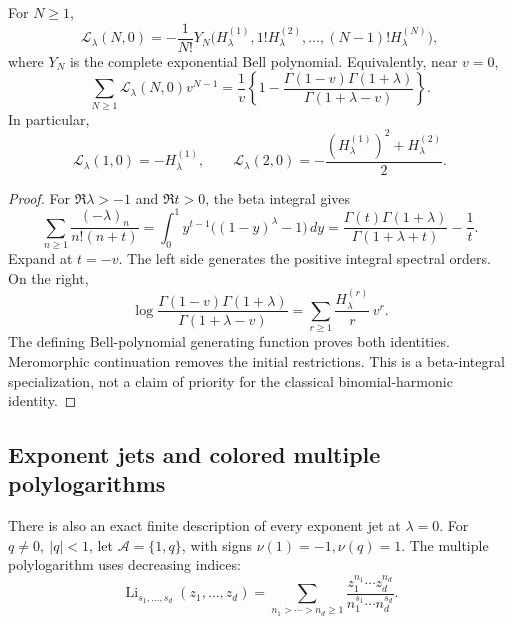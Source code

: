 \begin{theorem}[Every integral spectral order at \(q=0\)]
\label{bhr:cxp:thm:gamma}
For \(N\ge1\),
\begin{equation}\label{bhr:cxp:eq:Bell}
 \mathcal L_\lambda(N,0)
 =-\frac1{N!}Y_N\bigl(
     H_\lambda^{(1)},1!H_\lambda^{(2)},\ldots,
                          (N-1)!H_\lambda^{(N)}\bigr),
\end{equation}
where \(Y_N\) is the complete exponential Bell polynomial.
Equivalently, near \(v=0\),
\begin{equation}\label{bhr:cxp:eq:beta-generator}
 \sum_{N\ge1}\mathcal L_\lambda(N,0)v^{N-1}
 =\frac1v\left\{
 1-\frac{\Gamma(1-v)\Gamma(1+\lambda)}
                 {\Gamma(1+\lambda-v)}\right\}.
\end{equation}
In particular,
\[
 \mathcal L_\lambda(1,0)=-H_\lambda^{(1)},\qquad
 \mathcal L_\lambda(2,0)
 =-\frac{(H_\lambda^{(1)})^2+H_\lambda^{(2)}}2.
\]
\end{theorem}

\begin{proof}
For \(\Re\lambda>-1\) and \(\Re t>0\), the beta integral gives
\[
 \sum_{n\ge1}\frac{(-\lambda)_n}{n!(n+t)}
  =\int_0^1 y^{t-1}\bigl((1-y)^\lambda-1\bigr)\,dy
  =\frac{\Gamma(t)\Gamma(1+\lambda)}
           {\Gamma(1+\lambda+t)}-\frac1t.
\]
Expand at \(t=-v\).  The left side generates the positive
integral spectral orders.  On the right,
\[
 \log\frac{\Gamma(1-v)\Gamma(1+\lambda)}
              {\Gamma(1+\lambda-v)}
   =\sum_{r\ge1}\frac{H_\lambda^{(r)}}r\,v^r.
\]
The defining Bell-polynomial generating function proves both
identities.  Meromorphic continuation removes the initial
restrictions.  This is a beta-integral specialization, not a claim
of priority for the classical binomial-harmonic identity.
\end{proof}

\subsection{Exponent jets and colored multiple polylogarithms}

There is also an exact finite description of every exponent jet at
\(\lambda=0\).  For \(q\ne0,\ |q|<1\), let
\(\mathcal A=\{1,q\}\), with signs \(\nu(1)=-1,\nu(q)=1\).
The multiple polylogarithm uses decreasing indices:
\[
 \operatorname{Li}_{s_1,\ldots,s_d}(z_1,\ldots,z_d)
 =\sum_{n_1>\cdots>n_d\ge1}
       \frac{z_1^{n_1}\cdots z_d^{n_d}}
            {n_1^{s_1}\cdots n_d^{s_d}}.
\]


